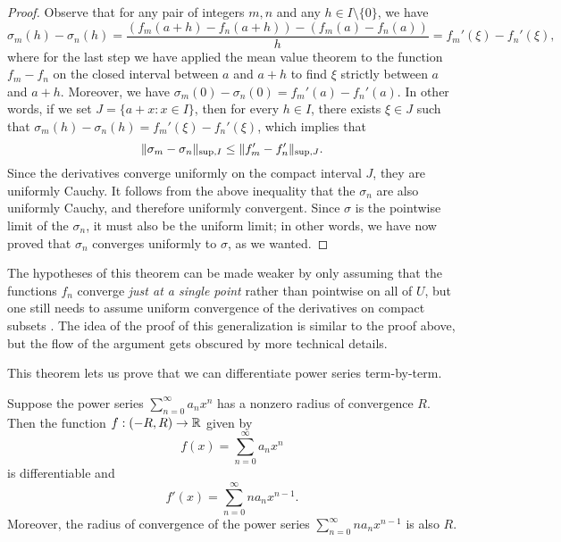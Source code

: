 \begin{proof}
	Observe that for any pair of integers $m, n$ and any $h \in I \setminus \{0\}$, we have
	\[ \sigma_m(h) - \sigma_n(h) = \frac{(f_m(a+h) - f_n(a+h)) - (f_m(a) - f_n(a))}{h} = f_m'(\xi) - f_n'(\xi), \]
	where for the last step we have applied the mean value theorem to the function $f_m - f_n$ on the closed interval between $a$ and $a + h$ to find $\xi$ strictly between $a$ and $a + h$. Moreover, we have $\sigma_m(0) - \sigma_n(0) = f_m'(a) - f_n'(a)$. In other words, if we set $J = \{a + x : x \in I\}$, then for every $h \in I$, there exists $\xi \in J$ such that $\sigma_m(h) - \sigma_n(h) = f_m'(\xi) - f_n'(\xi)$, which implies that
	\[ \|\sigma_m - \sigma_n\|_{\mathrm{sup}, I} \leq \|f_m' - f_n'\|_{\mathrm{sup}, J}. \]
	Since the derivatives converge uniformly on the compact interval $J$, they are uniformly Cauchy. It follows from the above inequality that the $\sigma_n$ are also uniformly Cauchy, and therefore uniformly convergent. Since $\sigma$ is the pointwise limit of the $\sigma_n$, it must also be the uniform limit; in other words, we have now proved that $\sigma_n$ converges uniformly to $\sigma$, as we wanted. 
\end{proof}

\begin{unimportantremark}
	The hypotheses of this theorem can be made weaker by only assuming that the functions $f_n$ converge \emph{just at a single point} rather than pointwise on all of $U$, but one still needs to assume uniform convergence of the derivatives on compact subsets \cite[theorem 7.17]{rudin}. The idea of the proof of this generalization is similar to the proof above, but the flow of the argument gets obscured by more technical details. 
\end{unimportantremark}


This theorem lets us prove that we can differentiate power series term-by-term.

\begin{theorem} \label{differentiating-power-series}
	Suppose the power series $\sum_{n = 0}^\infty a_n x^n$
	has a nonzero radius of convergence $R$. Then the function $f : (-R, R) \to \mathbb{R}$ given by
	\[ f(x) = \sum_{n = 0}^\infty a_n x^n \]
	is differentiable and
	\[ f'(x) = \sum_{n = 0}^\infty na_n x^{n-1}. \]
	Moreover, the radius of convergence of the power series $\sum_{n = 0}^\infty na_n x^{n-1}$
	is also $R$. 
\end{theorem}

